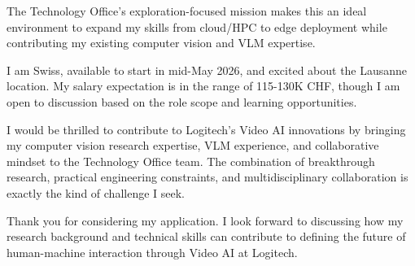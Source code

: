 \documentclass[11pt, a4paper]{awesome-cv}
\begin{document}
\begin{cvletter}
The Technology Office's exploration-focused mission makes this an ideal environment to expand my skills from cloud/HPC to edge deployment while contributing my existing computer vision and VLM expertise.

I am Swiss, available to start in mid-May 2026, and excited about the Lausanne location. My salary expectation is in the range of 115-130K CHF, though I am open to discussion based on the role scope and learning opportunities.

I would be thrilled to contribute to Logitech's Video AI innovations by bringing my computer vision research expertise, VLM experience, and collaborative mindset to the Technology Office team. The combination of breakthrough research, practical engineering constraints, and multidisciplinary collaboration is exactly the kind of challenge I seek.

Thank you for considering my application. I look forward to discussing how my research background and technical skills can contribute to defining the future of human-machine interaction through Video AI at Logitech.

\end{cvletter}


\makeletterclosing
\end{document}
